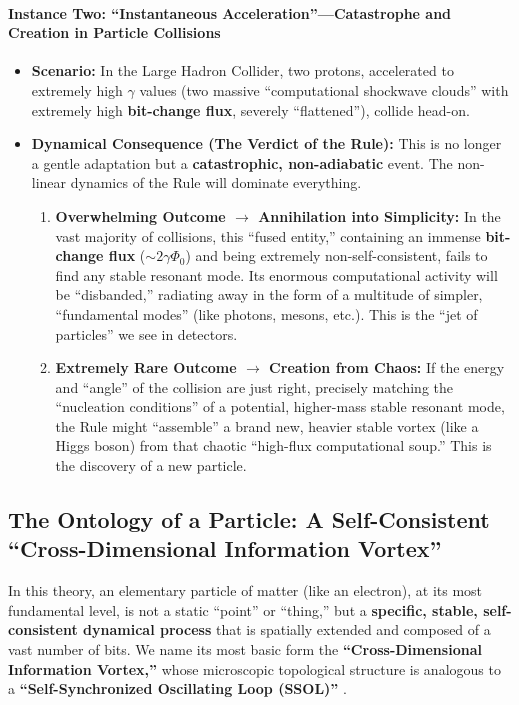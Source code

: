 \documentclass[11pt, a4paper]{article}
\begin{document}
\paragraph{Instance Two: ``Instantaneous Acceleration''—Catastrophe and Creation in Particle Collisions}
\begin{itemize}
    \item \textbf{Scenario:} In the Large Hadron Collider, two protons, accelerated to extremely high $\gamma$ values (two massive ``computational shockwave clouds'' with extremely high \textbf{bit-change flux}, severely ``flattened''), collide head-on.
    \item \textbf{Dynamical Consequence (The Verdict of the Rule):} This is no longer a gentle adaptation but a \textbf{catastrophic, non-adiabatic} event. The non-linear dynamics of the Rule will dominate everything.
    \begin{enumerate}
        \item \textbf{Overwhelming Outcome $\rightarrow$ Annihilation into Simplicity:} In the vast majority of collisions, this ``fused entity,'' containing an immense \textbf{bit-change flux} ($\sim 2\gamma\Phi_0$) and being extremely non-self-consistent, fails to find any stable resonant mode. Its enormous computational activity will be ``disbanded,'' radiating away in the form of a multitude of simpler, ``fundamental modes'' (like photons, mesons, etc.). This is the ``jet of particles'' we see in detectors.
        \item \textbf{Extremely Rare Outcome $\rightarrow$ Creation from Chaos:} If the energy and ``angle'' of the collision are just right, precisely matching the ``nucleation conditions'' of a potential, higher-mass stable resonant mode, the Rule might ``assemble'' a brand new, heavier stable vortex (like a Higgs boson) from that chaotic ``high-flux computational soup.'' This is the discovery of a new particle.
    \end{enumerate}
\end{itemize}

\subsection{The Ontology of a Particle: A Self-Consistent ``Cross-Dimensional Information Vortex''}

In this theory, an elementary particle of matter (like an electron), at its most fundamental level, is not a static ``point'' or ``thing,'' but a \textbf{specific, stable, self-consistent dynamical process} that is spatially extended and composed of a vast number of bits. We name its most basic form the \textbf{``Cross-Dimensional Information Vortex,''} whose microscopic topological structure is analogous to a \textbf{``Self-Synchronized Oscillating Loop (SSOL)''} \cite{DrazinJohnson1989, Skyrme1961}.
\end{document}

